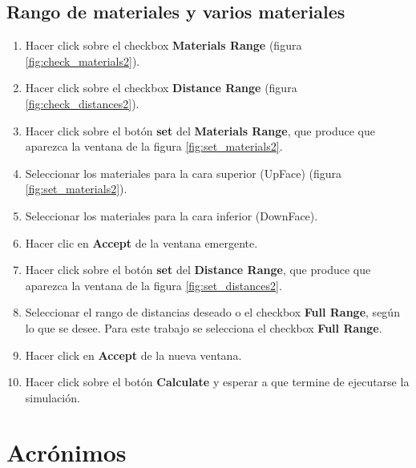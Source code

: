 \section{Rango de materiales y varios materiales}
\begin{enumerate}
			\item Hacer click sobre el checkbox \textbf{Materials Range} (figura \ref{fig:check_materials2}).
			\item Hacer click sobre el checkbox \textbf{Distance Range} (figura \ref{fig:check_distances2}).
			\item Hacer click sobre el botón \textbf{set} del \textbf{Materials Range}, que produce que aparezca la ventana de la figura \ref{fig:set_materials2}.
			\item Seleccionar los materiales para la cara superior (UpFace) (figura \ref{fig:set_materials2}).
			\item Seleccionar los materiales para la cara inferior (DownFace).
			\item Hacer clic en \textbf{Accept} de la ventana emergente.
			\item Hacer click sobre el botón \textbf{set} del \textbf{Distance Range}, que produce que aparezca la ventana de la figura \ref{fig:set_distances2}.
			\item Seleccionar el rango de distancias deseado o el checkbox \textbf{Full Range}, según lo que se desee. Para este trabajo se selecciona el checkbox \textbf{Full Range}.
			\item Hacer click en \textbf{Accept} de la nueva ventana.
			\item Hacer click sobre el botón \textbf{Calculate} y esperar a que termine de ejecutarse la simulación.
\end{enumerate}

\chapter{Acrónimos}

\let\cleardoublepage\clearpage
\glsaddall
\cleardoublepage
\printglossary[type=\acronymtype,title=Acr\'{o}nimos]

